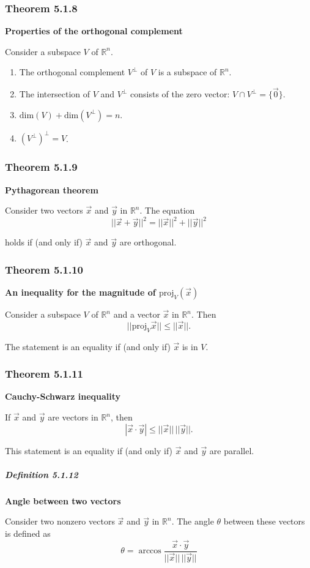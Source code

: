 \documentclass{report}
\begin{document}
\subsubsection*{Theorem 5.1.8}
\par\noindent\textbf{Properties of the orthogonal complement}
\par\noindent Consider a subspace $V$ of $\mathbb{R}^{n}$.
\renewcommand{\labelenumi}{\textbf{\alph{enumi}.}}
\begin{enumerate}
\item The orthogonal complement $V^{\perp}$ of $V$ is a subspace of $\mathbb{R}^{n}$.
\item The intersection of $V$ and $V^{\perp}$ consists of the zero vector: $V\cap{}V^{\perp}=\{\vec{0}\}$.
\item $\textrm{dim}(V)+\textrm{dim}(V^{\perp})=n$.
\item $\displaystyle (V^{\perp})^{\perp}=V$.
\end{enumerate}
\subsubsection*{Theorem 5.1.9}
\par\noindent\textbf{Pythagorean theorem}
\par\noindent Consider two vectors $\vec{x}$ and $\vec{y}$ in $\mathbb{R}^{n}$. The equation
\[||\vec{x}+\vec{y}||^{2}=||\vec{x}||^{2}+||\vec{y}||^{2}\]
\par\noindent holds if (and only if) $\vec{x}$ and $\vec{y}$ are orthogonal.
\subsubsection*{Theorem 5.1.10}
\par\noindent\textbf{An inequality for the magnitude of $\textrm{proj}_{V}(\vec{x})$}
\par\noindent Consider a subspace $V$ of $\mathbb{R}^{n}$ and a vector $\vec{x}$ in $\mathbb{R}^{n}$. Then
\[||\textrm{proj}_{V}\vec{x}||\le{}||\vec{x}||.\]
\par\noindent The statement is an equality if (and only if) $\vec{x}$ is in $V$.
\subsubsection*{Theorem 5.1.11}
\par\noindent\textbf{Cauchy-Schwarz inequality}
\par\noindent If $\vec{x}$ and $\vec{y}$ are vectors in $\mathbb{R}^{n}$, then
\[|\vec{x}\cdot{}\vec{y}|\le{}||\vec{x}||\,||\vec{y}||.\]
\par\noindent This statement is an equality if (and only if) $\vec{x}$ and $\vec{y}$ are parallel.
\subparagraph*{Definition 5.1.12}
\par\noindent\textbf{Angle between two vectors}
\par\noindent Consider two nonzero vectors $\vec{x}$ and $\vec{y}$ in $\mathbb{R}^{n}$. The angle $\theta$ between these vectors is defined as
\[\theta{}=\arccos{}\frac{\vec{x}\cdot{}\vec{y}}{||\vec{x}||\,||\vec{y}||}\]
\end{document}
